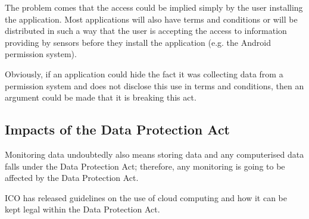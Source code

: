 \documentclass[12pt, a4paper]{article}
\begin{document}
The problem comes that the access could be implied simply by the user installing
the application. Most applications will also have terms and conditions or will
be distributed in such a way that the user is accepting the access to
information providing by sensors before they install the application (e.g. the
Android permission system).

Obviously, if an application could hide the fact it was collecting data from a
permission system and does not disclose this use in terms and conditions, then
an argument could be made that it is breaking this act.


\subsection{Impacts of the Data Protection Act}
Monitoring data undoubtedly also means storing data and any computerised data
falls under the Data Protection Act; therefore, any monitoring is going to be
affected by the Data Protection Act.

\gls{ICO} has released guidelines\cite{ico2012cloud} on the use of cloud 
computing and how it can be kept legal within the Data Protection Act.



\newpage


\end{document}
